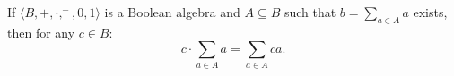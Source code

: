 If $\langle B, +, \cdot, ^-, 0, 1 \rangle$ is a Boolean algebra and $A \subseteq B$ such that $b = \sum_{a \in A} a$ exists, then for any $c \in B$:
$$c \cdot \sum_{a \in A} a = \sum_{a \in A} ca.$$
